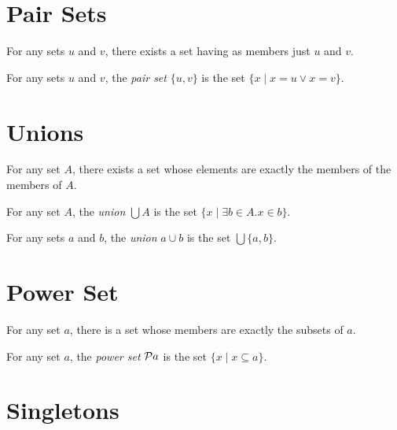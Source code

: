 \section{Pair Sets}

\begin{axiom}
    For any sets $u$ and $v$, there exists a set having as members just $u$ and $v$.
\end{axiom}

\begin{definition}
    For any sets $u$ and $v$, the \emph{pair set} $\{ u, v \}$ is the set $\{ x \mid x = u \vee x = v \}$.   
\end{definition}

\section{Unions}

\begin{axiom}
    For any set $A$, there exists a set whose elements are exactly the members of the members of $A$.
\end{axiom}

\begin{definition}
    For any set $A$, the \emph{union} $\bigcup A$ is the set $\{ x \mid \exists b \in A. x \in b \}$.
\end{definition}

\begin{definition}
    For any sets $a$ and $b$, the \emph{union} $a \cup b$ is the set $\bigcup \{ a, b \}$.
\end{definition}

\section{Power Set}

\begin{axiom}
    For any set $a$, there is a set whose members are exactly the subsets of $a$.    
\end{axiom}

\begin{definition}
    For any set $a$, the \emph{power set} $\mathcal{P} a$ is the set $\{ x \mid x \subseteq a \}$.
\end{definition}

\section{Singletons}

